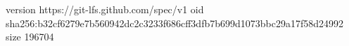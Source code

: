 version https://git-lfs.github.com/spec/v1
oid sha256:b32cf6279e7b560942dc2c3233f686cff3dfb7b699d1073bbc29a17f58d24992
size 196704
